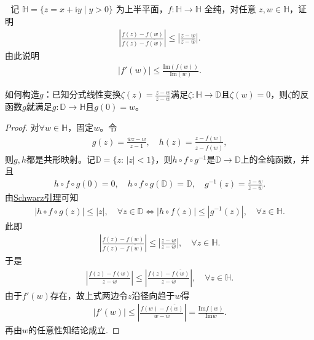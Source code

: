\documentclass[../../main.tex]{subfiles}%
\begin{document}
\begin{example}\,\,
记 $\mathbb{H} = \{z = x + \mathrm{i}y \mid y > 0\}$ 为上半平面，$f:\mathbb{H} \to \mathbb{H}$ 全纯，对任意 $z,w \in \mathbb{H}$，证明
\begin{align*}
\left|\frac{f(z)-f(w)}{f(z)-\overline{f(w)}}\right| \leqslant \left|\frac{z-w}{z-\overline{w}}\right|.
\end{align*}
由此说明
\begin{align*}
|f'(w)| \leqslant \frac{\mathrm{Im}(f(w))}{\mathrm{Im}(w)}.
\end{align*}
\end{example}
\begin{remark}
如何构造$g$：已知分式线性变换$\zeta(z)=\frac{z-w}{z-\overline{w}}$满足$\zeta:\mathbb{H}\to\mathbb{D}$且$\zeta(w)=0$，则$\zeta$的反函数$g$就满足$g:\mathbb{D}\to\mathbb{H}$且$g(0)=w$。
\end{remark}
\begin{proof}

对$\forall w\in\mathbb{H}$，固定$w$。令
\begin{align*}
g(z)=\frac{\overline{w}z-w}{z-1},\quad h(z)=\frac{z-f(w)}{z-\overline{f(w)}},
\end{align*}
则$g,h$都是共形映射。记$\mathbb{D}=\{z:\,|z|<1\}$，则$h\circ f\circ g^{-1}$是$\mathbb{D}\to\mathbb{D}$上的全纯函数，并且
\begin{align*}
h\circ f\circ g(0)=0,\quad h\circ f\circ g(\mathbb{D})=\mathbb{D},\quad g^{-1}(z)=\frac{z-w}{z-\overline{w}}.
\end{align*}
由\hyperref[theorem:Schwarz引理-定理4.5.3]{Schwarz引理}可知
\begin{align*}
|h\circ f\circ g(z)|\leqslant|z|,\quad \forall z\in\mathbb{D} \Longleftrightarrow |h\circ f(z)|\leqslant|g^{-1}(z)|,\quad \forall z\in\mathbb{H}.
\end{align*}
此即
\begin{align*}
\left| \frac{f(z)-f(w)}{f(z)-\overline{f(w)}} \right|\leqslant\left| \frac{z-w}{z-\overline{w}} \right|,\quad \forall z\in\mathbb{H}.
\end{align*}
于是
\begin{align*}
\left| \frac{f(z)-f(w)}{z-w} \right|\leqslant\left| \frac{f(z)-\overline{f(w)}}{z-\overline{w}} \right|,\quad \forall z\in\mathbb{H}.
\end{align*}
由于$f'(w)$存在，故上式两边令$z$沿径向趋于$w$得
\begin{align*}
|f'(w)|\leqslant\left| \frac{f(w)-\overline{f(w)}}{w-\overline{w}} \right|=\frac{\mathrm{Im}f(w)}{\mathrm{Im}w}.
\end{align*}
再由$w$的任意性知结论成立.

\end{proof}
\end{document}
